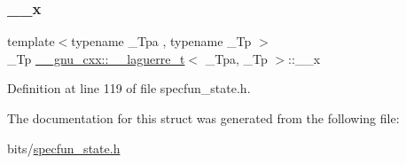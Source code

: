\subsubsection{\texorpdfstring{\+\_\+\+\_\+x}{\_\_x}}
{\footnotesize\ttfamily template$<$typename \+\_\+\+Tpa , typename \+\_\+\+Tp $>$ \\
\+\_\+\+Tp \hyperlink{struct____gnu__cxx_1_1____laguerre__t}{\+\_\+\+\_\+gnu\+\_\+cxx\+::\+\_\+\+\_\+laguerre\+\_\+t}$<$ \+\_\+\+Tpa, \+\_\+\+Tp $>$\+::\+\_\+\+\_\+x}



Definition at line 119 of file specfun\+\_\+state.\+h.



The documentation for this struct was generated from the following file\+:\begin{DoxyCompactItemize}
\item 
bits/\hyperlink{specfun__state_8h}{specfun\+\_\+state.\+h}\end{DoxyCompactItemize}
